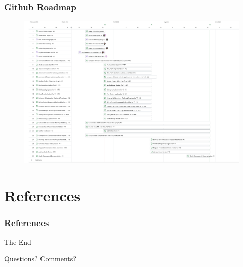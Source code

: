 \documentclass[
	11pt,
]{beamer}
\begin{document}
\begin{frame}
	\frametitle{Github Roadmap}
	\begin{figure}
		\includegraphics[width=.90\linewidth]{roadmap.jpg}
	\end{figure}
\end{frame}


\section{References}

\begin{frame}[allowframebreaks]
	\frametitle{References}
	
	
  \end{frame}


\begin{frame}
	\begin{center}
		{\Huge The End}

		\bigskip\bigskip

		{\LARGE Questions? Comments?}
	\end{center}
\end{frame}

\end{document}
